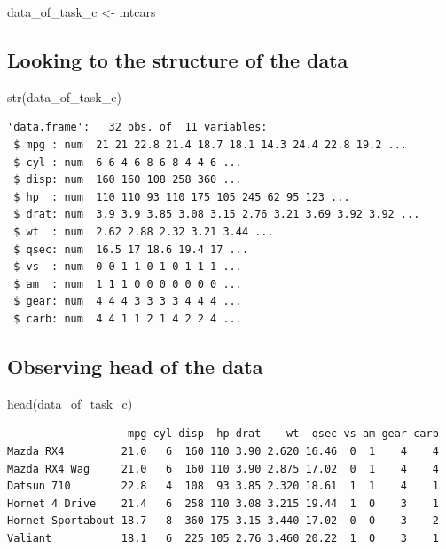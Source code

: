\documentclass[
  letterpaper,
  DIV=11,
  numbers=noendperiod]{scrartcl}
\newenvironment{Shaded}{\begin{snugshade}}{\end{snugshade}}
\newcommand{\FunctionTok}[1]{\textcolor[rgb]{0.28,0.35,0.67}{#1}}
\newcommand{\NormalTok}[1]{\textcolor[rgb]{0.00,0.23,0.31}{#1}}
\newcommand{\OtherTok}[1]{\textcolor[rgb]{0.00,0.23,0.31}{#1}}
\begin{document}
\begin{Shaded}
\begin{Highlighting}[]
\NormalTok{data\_of\_task\_c }\OtherTok{\textless{}{-}}\NormalTok{ mtcars}
\end{Highlighting}
\end{Shaded}

\subsection{Looking to the structure of the
data}\label{looking-to-the-structure-of-the-data}

\begin{Shaded}
\begin{Highlighting}[]
\FunctionTok{str}\NormalTok{(data\_of\_task\_c)}
\end{Highlighting}
\end{Shaded}

\begin{verbatim}
'data.frame':   32 obs. of  11 variables:
 $ mpg : num  21 21 22.8 21.4 18.7 18.1 14.3 24.4 22.8 19.2 ...
 $ cyl : num  6 6 4 6 8 6 8 4 4 6 ...
 $ disp: num  160 160 108 258 360 ...
 $ hp  : num  110 110 93 110 175 105 245 62 95 123 ...
 $ drat: num  3.9 3.9 3.85 3.08 3.15 2.76 3.21 3.69 3.92 3.92 ...
 $ wt  : num  2.62 2.88 2.32 3.21 3.44 ...
 $ qsec: num  16.5 17 18.6 19.4 17 ...
 $ vs  : num  0 0 1 1 0 1 0 1 1 1 ...
 $ am  : num  1 1 1 0 0 0 0 0 0 0 ...
 $ gear: num  4 4 4 3 3 3 3 4 4 4 ...
 $ carb: num  4 4 1 1 2 1 4 2 2 4 ...
\end{verbatim}

\subsection{Observing head of the
data}\label{observing-head-of-the-data}

\begin{Shaded}
\begin{Highlighting}[]
\FunctionTok{head}\NormalTok{(data\_of\_task\_c)}
\end{Highlighting}
\end{Shaded}

\begin{verbatim}
                   mpg cyl disp  hp drat    wt  qsec vs am gear carb
Mazda RX4         21.0   6  160 110 3.90 2.620 16.46  0  1    4    4
Mazda RX4 Wag     21.0   6  160 110 3.90 2.875 17.02  0  1    4    4
Datsun 710        22.8   4  108  93 3.85 2.320 18.61  1  1    4    1
Hornet 4 Drive    21.4   6  258 110 3.08 3.215 19.44  1  0    3    1
Hornet Sportabout 18.7   8  360 175 3.15 3.440 17.02  0  0    3    2
Valiant           18.1   6  225 105 2.76 3.460 20.22  1  0    3    1
\end{verbatim}
\end{document}
